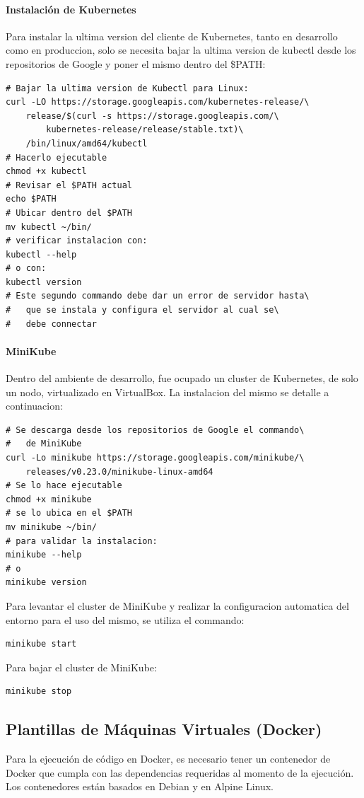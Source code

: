 \paragraph{Instalación de Kubernetes}
Para instalar la ultima version del cliente de Kubernetes, tanto en desarrollo como en produccion, solo se necesita bajar la ultima version de kubectl desde los repositorios de Google y poner el mismo dentro del \$PATH:
\begin{lstlisting}
# Bajar la ultima version de Kubectl para Linux:
curl -LO https://storage.googleapis.com/kubernetes-release/\
	release/$(curl -s https://storage.googleapis.com/\
    	kubernetes-release/release/stable.txt)\
	/bin/linux/amd64/kubectl
# Hacerlo ejecutable
chmod +x kubectl
# Revisar el $PATH actual
echo $PATH
# Ubicar dentro del $PATH
mv kubectl ~/bin/
# verificar instalacion con:
kubectl --help
# o con:
kubectl version
# Este segundo commando debe dar un error de servidor hasta\
#	que se instala y configura el servidor al cual se\
#	debe connectar
\end{lstlisting}

\paragraph{MiniKube}
Dentro del ambiente de desarrollo, fue ocupado un cluster de Kubernetes, de solo un nodo, virtualizado en VirtualBox. La instalacion del mismo se detalle a continuacion:
\begin{lstlisting}
# Se descarga desde los repositorios de Google el commando\
#	de MiniKube
curl -Lo minikube https://storage.googleapis.com/minikube/\
	releases/v0.23.0/minikube-linux-amd64
# Se lo hace ejecutable
chmod +x minikube
# se lo ubica en el $PATH
mv minikube ~/bin/
# para validar la instalacion:
minikube --help
# o
minikube version
\end{lstlisting}

Para levantar el cluster de MiniKube y realizar la configuracion automatica del entorno para el uso del mismo, se utiliza el commando:
\begin{lstlisting}
minikube start
\end{lstlisting}

Para bajar el cluster de MiniKube:
\begin{lstlisting}
minikube stop
\end{lstlisting}
  

\subsection{Plantillas de Máquinas Virtuales (Docker)}
Para la ejecución de código en Docker, es necesario tener un contenedor de Docker que cumpla con las dependencias requeridas al momento de la ejecución. Los contenedores están basados en Debian y en Alpine Linux.

